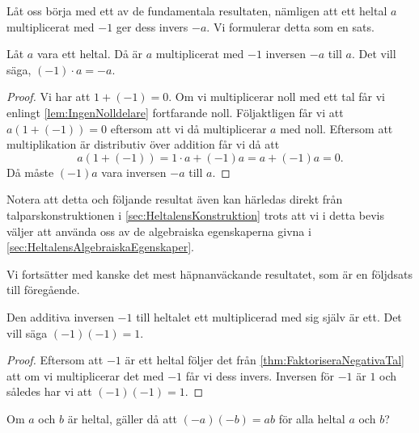 Låt oss börja med ett av de fundamentala resultaten,
nämligen att ett heltal \(a\) multiplicerat med \(-1\) ger dess invers \(-a\).
Vi formulerar detta som en sats.
\begin{theorem}\label{thm:FaktoriseraNegativaTal}
  Låt \(a\) vara ett heltal.
  Då är \(a\) multiplicerat med \(-1\) inversen \(-a\) till \(a\).
  Det vill säga, \((-1)\cdot a = -a\).
\end{theorem}
\begin{proof}
  Vi har att \(1+(-1) = 0\).
  Om vi multiplicerar noll med ett tal får vi enlingt
  \cref{lem:IngenNolldelare} fortfarande noll.
  Följaktligen får vi att \(a(1+(-1))=0\) eftersom att vi då multiplicerar
  \(a\) med noll.
  Eftersom att multiplikation är distributiv över addition får vi då att
  \begin{equation*}
    a(1+(-1)) = 1\cdot a + (-1)a = a + (-1)a = 0.
  \end{equation*}
  Då måste \((-1)a\) vara inversen \(-a\) till \(a\).
\end{proof}
\begin{remark}
  Notera att detta och följande resultat även kan härledas direkt från
  talparskonstruktionen i \cref{sec:HeltalensKonstruktion} trots att vi
  i detta bevis väljer att använda oss av de algebraiska egenskaperna givna i
  \cref{sec:HeltalensAlgebraiskaEgenskaper}.
\end{remark}

Vi fortsätter med kanske det mest häpnanväckande resultatet, som är en
följdsats till föregående.
\begin{corollary}\label{NegMultNegEqPos}
  Den additiva inversen \(-1\) till heltalet ett multiplicerad med sig
  själv är ett.
  Det vill säga \((-1)(-1) = 1\).
\end{corollary}
\begin{proof}
  Eftersom att \(-1\) är ett heltal följer det från
  \cref{thm:FaktoriseraNegativaTal} att om vi multiplicerar det med \(-1\)
  får vi dess invers.
  Inversen för \(-1\) är \(1\) och således har vi att \((-1)(-1)=1\).
\end{proof}

\begin{exercise}
  Om \(a\) och \(b\) är heltal, gäller då att \((-a)(-b) = ab\) för alla
  heltal \(a\) och \(b\)?
\end{exercise}

